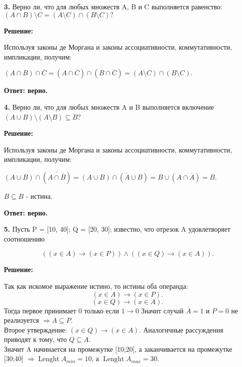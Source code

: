 \documentclass[a4paper,12pt]{article} %
\begin{document}
       
{\bf 3.} Верно ли, что для любых множеств A, B и C выполняется равенство: $(A \cap B) \setminus C = (A \setminus C) \cap (B \setminus C)?$
\begin{center}
\bfseries
{\Large Решение: }
\end{center}
Используя законы де Моргана и законы ассоциативности, коммутативности, импликации, получим:

$(A\cap B)\cap \overline{C} = (A \cap \overline{C}) \cap (B \cap \overline{C}) = (A \setminus C) \cap (B\setminus C).$
 
\begin{flushright}
\begin{large}
\textbf {Ответ: верно.}
\end{large}
\end{flushright}

\newpage
{\bf 4.} Верно ли, что для любых множеств A и B выполняется включение $(A \cup B) \setminus (A \setminus B) \subseteq B$?
\begin{center}
\bfseries
{\Large Решение: }
\end{center}
Используя законы де Моргана и законы ассоциативности, коммутативности, импликации, получим:

$(A\cup B) \cap (\overline{A\cap \overline{B}}) = (A\cup B) \cap (\overline{A} \cup B) = B \cup (A \cap \overline{A}) = B.$

$B \subseteq B$ - истина. 

\begin{flushright}
\begin{large}
\textbf {Ответ: верно.}
\end{large}
\end{flushright}

{\bf 5.} Пусть P = [10, 40]; Q = [20, 30]; известно, что отрезок A удовлетворяет соотношению

\[((x \in A) \rightarrow (x \in P)) \wedge ((x \in Q) \rightarrow (x \in A)).\]
\begin{center}
\bfseries
{\Large Решение: }
\end{center}
Так как искомое выражение истино, то истины оба операнда:$$(x \in A)\rightarrow(x \in P).$$  
$$(x \in Q) \rightarrow (x \in A).$$ Тогда первое принимает $0$ только если $1 \rightarrow 0$ Значит случай $\overline{A} = 1 $ и $P = 0$ не реализуется $\Rightarrow A\subseteq P.$\\
Второе утверждение: $(x \in Q) \rightarrow (x \in A)$. Аналогичные рассуждения приводят к тому, что $Q \subseteq A.$\\
Значит A начинается на промежутке [10;20], а заканчивается на промежутке [30;40] $\Rightarrow \operatorname{Lenght}{A_{min}} = 10$, а $ \operatorname{Lenght}{A_{max}} = 30.$
\end{document}
